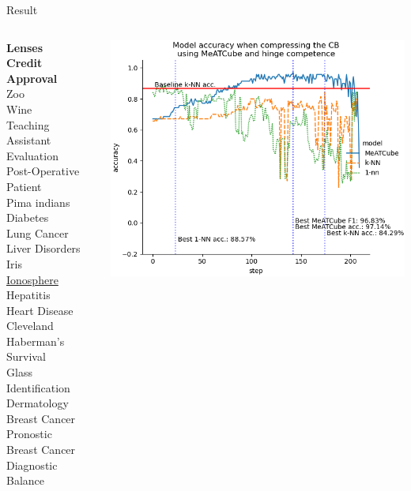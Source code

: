 \documentclass[]{beamer}
\begin{document}
\begin{frame}{Result}
    \begin{columns}
        \begin{column}{.35\textwidth}
            {\smaller\smaller
            \textbf{Lenses} \\
            \textbf{Credit Approval} \\
            Zoo \\
            Wine \\
            Teaching Assistant Evaluation \\
            Post-Operative Patient \\
            Pima indians Diabetes \\
            Lung Cancer \\
            Liver Disorders \\
            Iris \\
            \underline{Ionosphere} \\
            Hepatitis \\
            Heart Disease Cleveland \\
            Haberman's Survival \\
            Glass Identification \\
            Dermatology \\
            Breast Cancer Pronostic \\
            Breast Cancer Diagnostic \\
            Balance\\
            ~}
        \end{column}
        \begin{column}{.65\textwidth}
            \includegraphics[width=.8\textwidth]{../results/figs/ionosphere.png}

\end{column}
\end{columns}
\end{frame}
\end{document}
